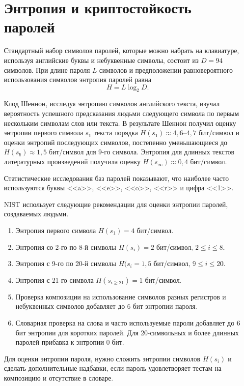 \documentclass[10pt,a4paper,openany]{book}
\begin{document}
\section[Энтропия и криптостойкость паролей]{Энтропия и криптостойкость \protect\\ паролей}

Стандартный набор символов паролей, которые можно набрать на клавиатуре, используя английские буквы и небуквенные символы, состоит из $D=94$ символов. При длине пароля $L$ символов и предположении равновероятного использования символов энтропия паролей равна
    \[ H = L \log_2 D. \]

Клод Шеннон, исследуя энтропию символов английского текста, изучал вероятность успешного предсказания людьми следующего символа по первым нескольким символам слов или текста. В результате Шеннон получил оценку энтропии первого символа $s_1$ текста порядка $H(s_1) \approx 4{,}6$--$4{,}7$ бит/символ и оценки энтропий последующих символов, постепенно уменьшающиеся до $H(s_9) \approx 1{,}5$ бит/символ для 9-го символа. Энтропия для длинных текстов литературных произведений получила оценку $H(s_\infty) \approx 0{,}4$ бит/символ.

Статистические исследования баз паролей показывают, что наиболее часто используются буквы <<a>>, <<e>>, <<o>>, <<r>> и цифра <<1>>.

NIST использует следующие рекомендации для оценки энтропии паролей, создаваемых людьми.
\begin{enumerate}
    \item Энтропия первого символа $H(s_1) = 4$ бит/символ.
    \item Энтропия со 2-го по 8-й символы $H(s_{i}) = 2$ бит/символ, $2 \leq i \leq 8$.
    \item Энтропия с 9-го по 20-й символы $H(s_{i} = 1{,}5$ бит/символ, $9 \leq i \leq 20$.
    \item Энтропия с 21-го символа $H(s_{i \geq 21}) = 1$ бит/символ.
    \item Проверка композиции на использование символов разных регистров и небуквенных символов добавляет до 6 бит энтропии пароля.
    \item Словарная проверка на слова и часто используемые пароли добавляет до 6 бит энтропии для коротких паролей. Для 20-символьных и более длинных паролей прибавка к энтропии 0 бит.
\end{enumerate}

Для оценки энтропии пароля, нужно сложить энтропии символов $H(s_i)$ и сделать дополнительные надбавки, если пароль удовлетворяет тестам на композицию и отсутствие в словаре.
\end{document}
